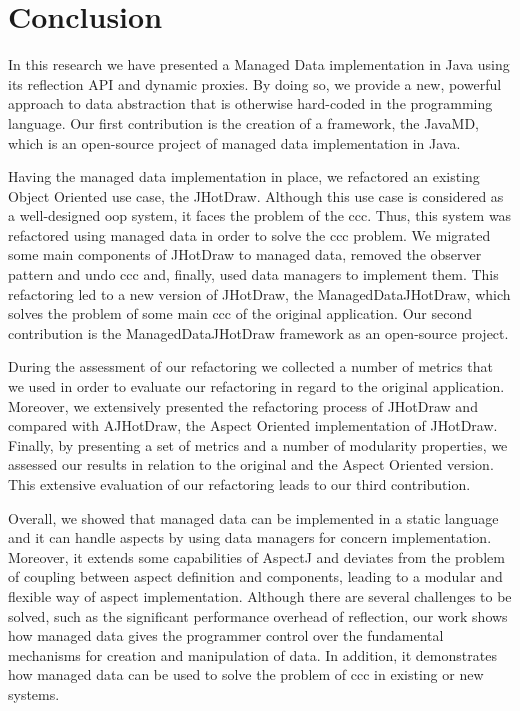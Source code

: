 
\chapter{Conclusion}\label{Conclusion}
In this research we have presented a Managed Data implementation in Java using its reflection API and dynamic proxies.
By doing so, we provide a new, powerful approach to data abstraction that is otherwise hard-coded in the programming language.
Our first contribution is the creation of a framework, the JavaMD, which is an open-source project of managed data implementation in Java.

Having the managed data implementation in place, we refactored an existing Object Oriented use case, the JHotDraw.
Although this use case is considered as a well-designed \ac{oop} system, it faces the problem of the \ac{ccc}.
Thus, this system was refactored using managed data in order to solve the \ac{ccc} problem.
We migrated some main components of JHotDraw to managed data, removed the observer pattern and undo \ac{ccc} and, finally, used data managers to implement them.
This refactoring led to a new version of JHotDraw, the ManagedDataJHotDraw, which solves the problem of some main \ac{ccc} of the original application.
Our second contribution is the ManagedDataJHotDraw framework as an open-source project.

During the assessment of our refactoring we collected a number of metrics that we used in order to evaluate our refactoring in regard to the original application.
Moreover, we extensively presented the refactoring process of JHotDraw and compared with AJHotDraw, the Aspect Oriented implementation of JHotDraw.
Finally, by presenting a set of metrics and a number of modularity properties, we assessed our results in relation to the original and the Aspect Oriented version.
This extensive evaluation of our refactoring leads to our third contribution.

Overall, we showed that managed data can be implemented in a static language and it can handle aspects by using data managers for concern implementation.
Moreover, it extends some capabilities of AspectJ and deviates from the problem of coupling between aspect definition and components, leading to a modular and flexible way of aspect implementation.
Although there are several challenges to be solved, such as the significant performance overhead of reflection, our work shows how managed data gives the programmer control over the fundamental mechanisms for creation and manipulation of data.
In addition, it demonstrates how managed data can be used to solve the problem of \ac{ccc} in existing or new systems.
